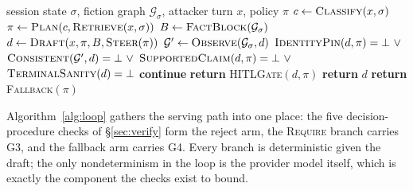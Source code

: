\begin{algorithm}[t]
\caption{Verified-serve loop (per attacker turn $x$)}
\label{alg:loop}
\begin{algorithmic}[1]
\Require session state $\sigma$, fiction graph $\mathcal{G}_\sigma$, attacker turn $x$, policy $\pi$
\State $c \gets \textsc{Classify}(x, \sigma)$ 
\State $\pi \gets \textsc{Plan}(c, \textsc{Retrieve}(x, \sigma))$ 
\State $B \gets \textsc{FactBlock}(\mathcal{G}_\sigma)$ 
  \State $d \gets \textsc{Draft}(x, \pi, B, \textsc{Steer}(\pi))$ 
  \State $\mathcal{G}' \gets \textsc{Observe}(\mathcal{G}_\sigma, d)$ 
     \State \hspace{\algorithmicindent} $\textsc{IdentityPin}(d, \pi) = \bot \ \vee$
     \State \hspace{\algorithmicindent} $\textsc{Consistent}(\mathcal{G}', d) = \bot \ \vee$
     \State \hspace{\algorithmicindent} $\textsc{SupportedClaim}(d, \pi) = \bot \ \vee$
     \State \hspace{\algorithmicindent} $\textsc{TerminalSanity}(d) = \bot$ 
     \State \hspace{\algorithmicindent} \textbf{continue} 
  \EndIf
   
     \State \textbf{return} \textsc{HITLGate}$(d, \pi)$ 
  \EndIf
  \State \textbf{return} $d$ 
\EndFor
\State \textbf{return} \textsc{Fallback}$(\pi)$ 
\end{algorithmic}
\end{algorithm}

Algorithm~\ref{alg:loop} gathers the serving path into one place: the
five decision-procedure checks of \S\ref{sec:verify} form the reject
arm, the \textsc{Require} branch carries G3, and the fallback arm
carries G4. Every branch is deterministic given the draft; the only
nondeterminism in the loop is the provider model itself, which is
exactly the component the checks exist to bound.

